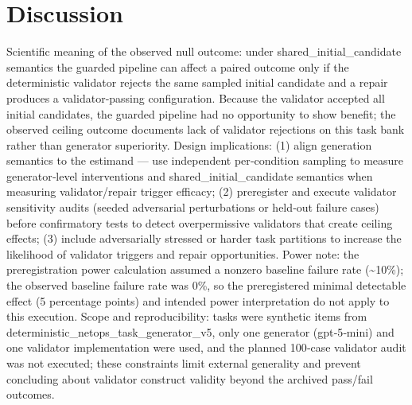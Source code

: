 \documentclass[conference]{IEEEtran}
\begin{document}
\section{Discussion}
Scientific meaning of the observed null outcome: under shared\_initial\_candidate semantics the guarded pipeline can affect a paired outcome only if the deterministic validator rejects the same sampled initial candidate and a repair produces a validator‑passing configuration. Because the validator accepted all initial candidates, the guarded pipeline had no opportunity to show benefit; the observed ceiling outcome documents lack of validator rejections on this task bank rather than generator superiority. Design implications: (1) align generation semantics to the estimand --- use independent per‑condition sampling to measure generator‑level interventions and shared\_initial\_candidate semantics when measuring validator/repair trigger efficacy; (2) preregister and execute validator sensitivity audits (seeded adversarial perturbations or held‑out failure cases) before confirmatory tests to detect overpermissive validators that create ceiling effects; (3) include adversarially stressed or harder task partitions to increase the likelihood of validator triggers and repair opportunities. Power note: the preregistration power calculation assumed a nonzero baseline failure rate (\textasciitilde{}10\%); the observed baseline failure rate was 0\%, so the preregistered minimal detectable effect (5 percentage points) and intended power interpretation do not apply to this execution. Scope and reproducibility: tasks were synthetic items from deterministic\_netops\_task\_generator\_v5, only one generator (gpt‑5‑mini) and one validator implementation were used, and the planned 100‑case validator audit was not executed; these constraints limit external generality and prevent concluding about validator construct validity beyond the archived pass/fail outcomes.
\end{document}

